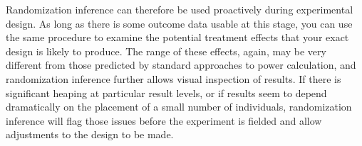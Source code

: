 Randomization inference can therefore be used proactively during experimental design.
As long as there is some outcome data usable at this stage,
you can use the same procedure to examine the potential treatment effects
that your exact design is likely to produce.
The range of these effects, again, may be very different
from those predicted by standard approaches to power calculation,
and randomization inference further allows visual inspection of results.
If there is significant heaping at particular result levels,
or if results seem to depend dramatically on the placement of a small number of individuals,
randomization inference will flag those issues before the experiment is fielded
and allow adjustments to the design to be made.